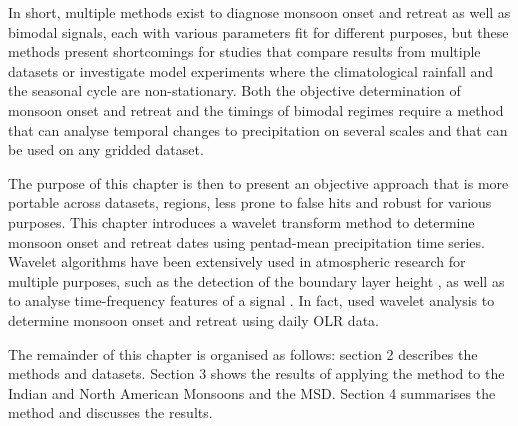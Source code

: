 In short, multiple methods exist to diagnose monsoon onset and retreat as well as bimodal signals, each with various parameters fit for different purposes, but these methods present shortcomings for studies that compare results from multiple datasets or investigate model experiments where the climatological rainfall and the seasonal cycle are non-stationary.
Both the objective determination of monsoon onset and retreat and the timings of bimodal regimes require a method that can analyse temporal changes to precipitation on several scales and that can be used on any gridded dataset. 



  The purpose of this chapter is then to present an objective approach that is more portable across datasets, regions, less prone to false hits and robust for various purposes.
This chapter introduces a wavelet transform method to determine monsoon onset and retreat dates using pentad-mean precipitation time series.  Wavelet algorithms have been extensively used in atmospheric research for multiple purposes, such as the detection of the boundary layer height \citep[e.g.][]{brooks2003}, as well as to analyse time-frequency features of a signal \citep[e.g.][]{whitcher2000,dimdore2021}. In fact, \cite{allen2017} used wavelet analysis to determine monsoon onset and retreat using daily OLR data. 

The remainder of this chapter is organised as follows: section 2 describes the methods and datasets. Section 3 shows the results of applying the method to the Indian and North American Monsoons and the MSD.
 Section 4 summarises the method and discusses the results.



